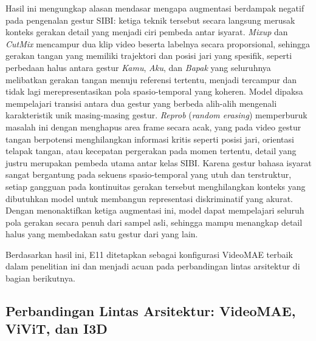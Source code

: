 Hasil ini mengungkap alasan mendasar mengapa augmentasi berdampak negatif pada pengenalan gestur SIBI: ketiga teknik tersebut secara langsung merusak konteks gerakan detail yang menjadi ciri pembeda antar isyarat. \textit{Mixup} dan \textit{CutMix} mencampur dua klip video beserta labelnya secara proporsional, sehingga gerakan tangan yang memiliki trajektori dan posisi jari yang spesifik, seperti perbedaan halus antara gestur \textit{Kamu}, \textit{Aku}, dan \textit{Bapak} yang seluruhnya melibatkan gerakan tangan menuju referensi tertentu, menjadi tercampur dan tidak lagi merepresentasikan pola spasio-temporal yang koheren. Model dipaksa mempelajari transisi antara dua gestur yang berbeda alih-alih mengenali karakteristik unik masing-masing gestur. \textit{Reprob} (\textit{random erasing}) memperburuk masalah ini dengan menghapus area frame secara acak, yang pada video gestur tangan berpotensi menghilangkan informasi kritis seperti posisi jari, orientasi telapak tangan, atau kecepatan pergerakan pada momen tertentu, detail yang justru merupakan pembeda utama antar kelas SIBI. Karena gestur bahasa isyarat sangat bergantung pada sekuens spasio-temporal yang utuh dan terstruktur, setiap gangguan pada kontinuitas gerakan tersebut menghilangkan konteks yang dibutuhkan model untuk membangun representasi diskriminatif yang akurat. Dengan menonaktifkan ketiga augmentasi ini, model dapat mempelajari seluruh pola gerakan secara penuh dari sampel asli, sehingga mampu menangkap detail halus yang membedakan satu gestur dari yang lain.\par

Berdasarkan hasil ini, E11 ditetapkan sebagai konfigurasi VideoMAE terbaik dalam penelitian ini dan menjadi acuan pada perbandingan lintas arsitektur di bagian berikutnya.\par

\subsection{Perbandingan Lintas Arsitektur: VideoMAE, ViViT, dan I3D} \label{IV.Sek6}

